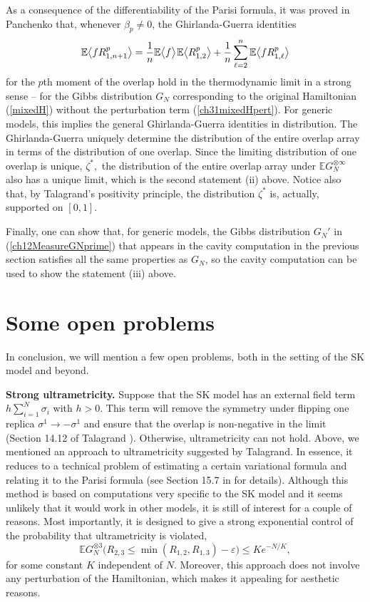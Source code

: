 \documentclass[12pt]{article}
\newcommand{\eps}{{\varepsilon}}
\newcommand{\smsp}{\hspace{0.3mm}}
\newcommand{\e}{\mathbb{E}}
\newcommand{\la}{\langle}
\newcommand{\ra}{\rangle}
\theoremstyle{nonumberplain}
\begin{document}
As a consequence of the differentiability of the Parisi formula, it was proved in Panchenko \cite{PGGmixed} that, whenever $\beta_p\not = 0$, the Ghirlanda-Guerra identities
\begin{equation}
\e  \bigl\la f R_{1,n+1}^p \bigr\ra 
=
 \frac{1}{n}\e \bigl\la f \bigr\ra \smsp \e\bigl\la R_{1,2}^p\bigr\ra 
 +
 \frac{1}{n}\sum_{\ell=2}^{n}\e \bigl\la f R_{1,\ell}^p\bigr\ra
\label{ch31GGlimitAgain}
\end{equation}
for the $p$th moment of the overlap hold in the thermodynamic limit in a strong sense -- for the Gibbs distribution $G_N$ corresponding to the original Hamiltonian (\ref{mixedH}) without the perturbation term (\ref{ch31mixedHpert}). For generic models, this implies the general Ghirlanda-Guerra identities in distribution. The Ghirlanda-Guerra uniquely determine the distribution of the entire overlap array in terms of  the distribution of one overlap. Since the limiting distribution of one overlap is unique, $\zeta^*,$ the distribution of the entire overlap array under $\e G_N^{\otimes\infty}$ also has a unique limit, which is the second statement (ii) above.  Notice also that, by Talagrand's positivity principle, the distribution $\zeta^*$ is, actually, supported on $[0,1]$.

Finally, one can show that, for generic models, the Gibbs distribution $G_N'$ in (\ref{ch12MeasureGNprime}) that appears in the cavity computation in the previous section satisfies all the same properties as $G_N$, so the cavity computation can be used to show the statement (iii) above.


\section{Some open problems}\label{SecLabel-Problems}

In conclusion, we will mention a few open problems, both in the setting of the SK model and beyond.

\medskip
\noindent
\textbf{Strong ultrametricity.} Suppose that the SK model has an external field term $h\sum_{i=1}^N\sigma_i$ with $h>0$. This term will remove the symmetry under flipping one replica $\sigma^1\to-\sigma^1$ and ensure that the overlap is non-negative in the limit (Section 14.12 of Talagrand \cite{SG2, SG2-2}). Otherwise, ultrametricity can not hold. Above, we mentioned an approach to ultrametricity suggested by Talagrand. In essence, it reduces to a technical problem of estimating a certain variational formula and relating it to the Parisi formula (see Section 15.7 in \cite{SG2, SG2-2} for details). Although this method is based on computations very specific to the SK model and it seems unlikely that it would work in other models, it is still of interest for a couple of reasons. Most importantly, it is designed to give a strong exponential control of the probability that ultrametricity is violated,
$$
\e G_N^{\otimes 3}\bigl(R_{2,3}\leq \min(R_{1,2}, R_{1,3}) - \eps\bigr) \leq Ke^{-N/K},
$$
for some constant $K$ independent of $N$. Moreover, this approach does not involve any perturbation of the Hamiltonian, which makes it appealing for aesthetic reasons. 
  
\end{document}
